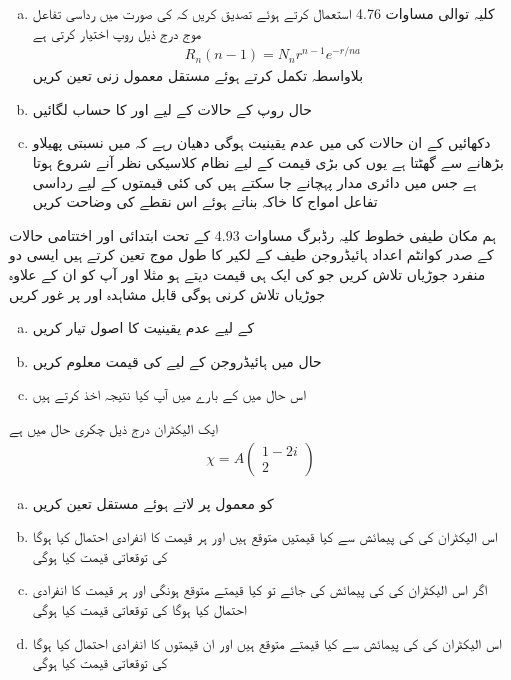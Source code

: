 \begin{enumerate}[a.]
\item
کلیہ توالی مساوات 4.76 استعمال کرتے ہوئے تصدیق کریں کہ  کی صورت میں رداسی تفاعل موج درج ذیل روپ اختیار کرتی ہے 
\begin{align*}
R_n (n - 1) = N_n r^{n - 1} e^{-r/na}
\end{align*}
بلاواسطہ تکمل کرتے ہوئے مستقل معمول زنی  تعین کریں 
\item
حال  روپ کے حالات کے لیے  اور  کا حساب لگائیں 
\item
دکھائیں کے ان حالات کی   میں عدم یقینیت  ہوگی دھیان رہے کہ  میں نسبتی پهيلاو  بڑھانے سے گھٹتا ہے یوں  کی بڑی قیمت کے لیے نظام کلاسیکی نظر آنے شروع ہوتا ہے جس میں دائری مدار پہچانے جا سکتے ہیں  کی کئی قیمتوں کے لیے رداسی تفاعل امواج کا خاکہ بناتے ہوئے اس نقطے کی وضاحت کریں 
\end{enumerate}
ہم مکان طیفی خطوط کلیہ رڈبرگ مساوات 4.93 کے تحت ابتدائی اور اختتامی حالات کے صدر کوانٹم اعداد ہائیڈروجن طيف کے لکیر کا طول موج تعین کرتے ہیں ایسی دو منفرد جوڑیاں  تلاش کریں جو  کی ایک ہی قیمت دیتے ہو مثلا  اور  آپ کو ان کے علاوہ جوڑیاں تلاش کرنی ہوگی 
قابل مشاہدہ   اور  پر غور کریں 
\begin{enumerate}[a.]
\item
{} کے لیے عدم یقینیت کا اصول تیار کریں 
\item
حال  میں ہائیڈروجن کے لیے  کی قیمت معلوم کریں 
\item
اس حال میں  کے بارے میں آپ کیا نتیجہ اخذ کرتے ہیں 
\end{enumerate}
ایک الیکٹران درج ذیل چکری حال میں ہے 
\begin{align*}
\chi = A
\begin{pmatrix}
1 - 2i \\
2
\end{pmatrix}
\end{align*}
\begin{enumerate}[a.]
\item
{} کو معمول پر لاتے ہوئے مستقل  تعین کریں 
\item
اس الیکٹران کی  کی پیمائش سے کیا قیمتیں متوقع ہیں اور ہر قیمت کا انفرادی احتمال کیا ہوگا  کی توقعاتی قیمت کیا ہوگی 
\item
اگر اس الیکٹران کی  کی پیمائش کی جائے تو کیا قیمتے متوقع ہونگی اور ہر قیمت کا انفرادی احتمال کیا ہوگا  کی توقعاتی قیمت کیا ہوگی 
\item
اس الیکٹران کی  کی پیمائش سے کیا قیمتے متوقع ہیں اور ان قیمتوں کا انفرادی احتمال کیا ہوگا  کی توقعاتی قیمت کیا ہوگی 
\end{enumerate}


